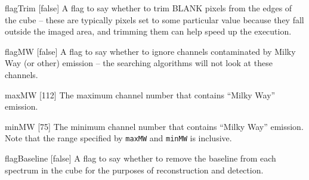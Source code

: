 \begin{Lentry}
\item[{flagTrim [false]}] A flag to say whether to trim
  BLANK pixels from the edges of the cube -- these are typically
  pixels set to some particular value because they fall outside the
  imaged area, and trimming them can help speed up the execution.
\item[{flagMW [false]}] A flag to say whether to ignore
  channels contaminated by Milky Way (or other) emission -- the
  searching algorithms will not look at these channels.
\item[{maxMW [112]}] The maximum channel number that contains
  ``Milky Way'' emission.
\item[{minMW [75]}] The minimum channel number that contains
  ``Milky Way'' emission. Note that the range specified by
  \texttt{maxMW} and \texttt{minMW} is inclusive.
\item[{flagBaseline [false]}] A flag to say whether to remove
  the baseline from each spectrum in the cube for the purposes of
  reconstruction and detection.
\end{Lentry}


